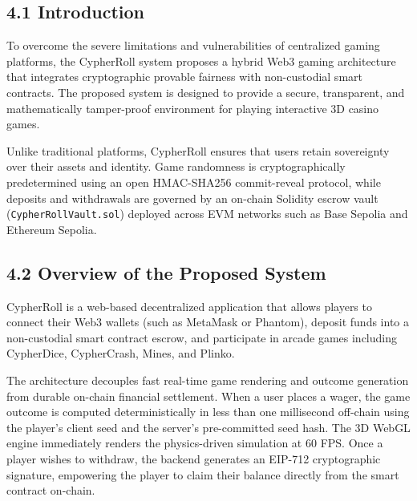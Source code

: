 \vspace{1.0cm}
\par
\label{chap:proposed}
\vspace{0.15cm}
\par
\vspace{0.3cm}

\subsection*{4.1 Introduction}
To overcome the severe limitations and vulnerabilities of centralized gaming platforms, the CypherRoll system proposes a hybrid Web3 gaming architecture that integrates cryptographic provable fairness with non-custodial smart contracts. The proposed system is designed to provide a secure, transparent, and mathematically tamper-proof environment for playing interactive 3D casino games.

Unlike traditional platforms, CypherRoll ensures that users retain sovereignty over their assets and identity. Game randomness is cryptographically predetermined using an open HMAC-SHA256 commit-reveal protocol, while deposits and withdrawals are governed by an on-chain Solidity escrow vault (\texttt{CypherRollVault.sol}) deployed across EVM networks such as Base Sepolia and Ethereum Sepolia.

\subsection*{4.2 Overview of the Proposed System}
CypherRoll is a web-based decentralized application that allows players to connect their Web3 wallets (such as MetaMask or Phantom), deposit funds into a non-custodial smart contract escrow, and participate in arcade games including CypherDice, CypherCrash, Mines, and Plinko.

The architecture decouples fast real-time game rendering and outcome generation from durable on-chain financial settlement. When a user places a wager, the game outcome is computed deterministically in less than one millisecond off-chain using the player's client seed and the server's pre-committed seed hash. The 3D WebGL engine immediately renders the physics-driven simulation at 60 FPS. Once a player wishes to withdraw, the backend generates an EIP-712 cryptographic signature, empowering the player to claim their balance directly from the smart contract on-chain.

